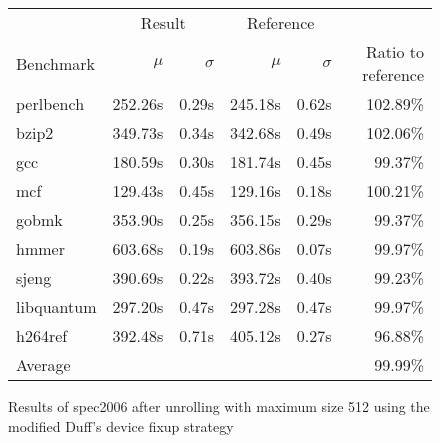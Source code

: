 \begin{figure}[bh]
    \begin{center}
        \begin{tabular}{lrrrrr}
            \toprule
            & \multicolumn{2}{c}{Result} & \multicolumn{2}{c}{Reference}\\
            Benchmark & $\mu$ & $\sigma$ & $\mu$ & $\sigma$ & Ratio to reference\\
            \midrule
            perlbench & 252.26s & 0.29s & 245.18s & 0.62s & 102.89\%\\
            bzip2 & 349.73s & 0.34s & 342.68s & 0.49s & 102.06\%\\
            gcc & 180.59s & 0.30s & 181.74s & 0.45s & 99.37\%\\
            mcf & 129.43s & 0.45s & 129.16s & 0.18s & 100.21\%\\
            gobmk & 353.90s & 0.25s & 356.15s & 0.29s & 99.37\%\\
            hmmer & 603.68s & 0.19s & 603.86s & 0.07s & 99.97\%\\
            sjeng & 390.69s & 0.22s & 393.72s & 0.40s & 99.23\%\\
            libquantum & 297.20s & 0.47s & 297.28s & 0.47s & 99.97\%\\
            h264ref & 392.48s & 0.71s & 405.12s & 0.27s & 96.88\%\\
            \midrule
            Average & & & & & 99.99\%\\
            \bottomrule
        \end{tabular}
    \end{center}
    \caption{Results of spec2006 after unrolling with maximum size 512 using the modified Duff's device fixup strategy}
    \label{fig:eval:perf:duff:512}
\end{figure}
